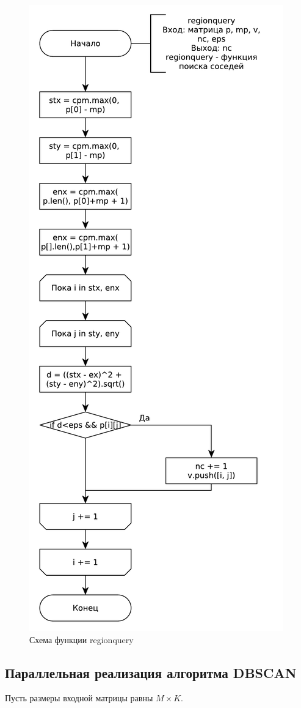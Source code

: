 \begin{figure}[ht!]
	\centering
	\includegraphics[width=0.5\linewidth]{assets/graphs/regionquery.pdf}
	\caption{Схема функции regionquery}
	\label{fig:alg2}
\end{figure}

\subsection{Параллельная реализация алгоритма DBSCAN}


Пусть размеры входной матрицы равны $M \times K$.

